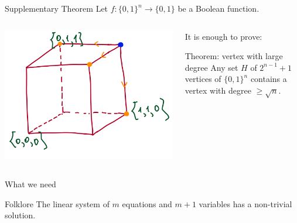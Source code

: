 \documentclass[aspectratio=169,professionalfonts]{beamer}
\newcommand{\Q}{{\{0,1\}}}
\begin{document}
\begin{frame}{Supplementary Theorem}
    Let $f \colon \Q^n \to \Q$ be a Boolean function.
    \vspace{0.3in}
    
    \begin{columns}[T]
    \begin{column}{0.4\textwidth}
    \includegraphics[width=1.4\textwidth]{cube_neighbors.png}
    \end{column}
    \begin{column}{0.6\textwidth}
    It is enough to prove:
    \begin{block}{Theorem: vertex with large degree}
    Any set $H$ of $2^{n-1}+1$ vertices of $\Q^n$ contains a vertex with degree $\geq \sqrt{n}$.
    \end{block}
    \end{column}
    \end{columns}
\end{frame}

\begin{frame}{What we need}
    \begin{block}{Folklore}
         The linear system of $m$ equations and $m+1$ variables has a non-trivial solution.
    \end{block}
\end{frame}
\end{document}
